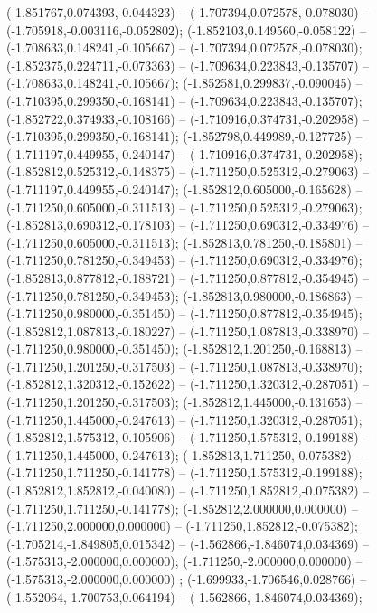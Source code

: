  (-1.851767,0.074393,-0.044323) -- (-1.707394,0.072578,-0.078030) -- (-1.705918,-0.003116,-0.052802);
 (-1.852103,0.149560,-0.058122) -- (-1.708633,0.148241,-0.105667) -- (-1.707394,0.072578,-0.078030);
 (-1.852375,0.224711,-0.073363) -- (-1.709634,0.223843,-0.135707) -- (-1.708633,0.148241,-0.105667);
 (-1.852581,0.299837,-0.090045) -- (-1.710395,0.299350,-0.168141) -- (-1.709634,0.223843,-0.135707);
 (-1.852722,0.374933,-0.108166) -- (-1.710916,0.374731,-0.202958) -- (-1.710395,0.299350,-0.168141);
 (-1.852798,0.449989,-0.127725) -- (-1.711197,0.449955,-0.240147) -- (-1.710916,0.374731,-0.202958);
 (-1.852812,0.525312,-0.148375) -- (-1.711250,0.525312,-0.279063) -- (-1.711197,0.449955,-0.240147);
 (-1.852812,0.605000,-0.165628) -- (-1.711250,0.605000,-0.311513) -- (-1.711250,0.525312,-0.279063);
 (-1.852813,0.690312,-0.178103) -- (-1.711250,0.690312,-0.334976) -- (-1.711250,0.605000,-0.311513);
 (-1.852813,0.781250,-0.185801) -- (-1.711250,0.781250,-0.349453) -- (-1.711250,0.690312,-0.334976);
 (-1.852813,0.877812,-0.188721) -- (-1.711250,0.877812,-0.354945) -- (-1.711250,0.781250,-0.349453);
 (-1.852813,0.980000,-0.186863) -- (-1.711250,0.980000,-0.351450) -- (-1.711250,0.877812,-0.354945);
 (-1.852812,1.087813,-0.180227) -- (-1.711250,1.087813,-0.338970) -- (-1.711250,0.980000,-0.351450);
 (-1.852812,1.201250,-0.168813) -- (-1.711250,1.201250,-0.317503) -- (-1.711250,1.087813,-0.338970);
 (-1.852812,1.320312,-0.152622) -- (-1.711250,1.320312,-0.287051) -- (-1.711250,1.201250,-0.317503);
 (-1.852812,1.445000,-0.131653) -- (-1.711250,1.445000,-0.247613) -- (-1.711250,1.320312,-0.287051);
 (-1.852812,1.575312,-0.105906) -- (-1.711250,1.575312,-0.199188) -- (-1.711250,1.445000,-0.247613);
 (-1.852813,1.711250,-0.075382) -- (-1.711250,1.711250,-0.141778) -- (-1.711250,1.575312,-0.199188);
 (-1.852812,1.852812,-0.040080) -- (-1.711250,1.852812,-0.075382) -- (-1.711250,1.711250,-0.141778);
 (-1.852812,2.000000,0.000000) -- (-1.711250,2.000000,0.000000) -- (-1.711250,1.852812,-0.075382);
 (-1.705214,-1.849805,0.015342) -- (-1.562866,-1.846074,0.034369) -- (-1.575313,-2.000000,0.000000);
 (-1.711250,-2.000000,0.000000) -- (-1.575313,-2.000000,0.000000) ;
 (-1.699933,-1.706546,0.028766) -- (-1.552064,-1.700753,0.064194) -- (-1.562866,-1.846074,0.034369);
